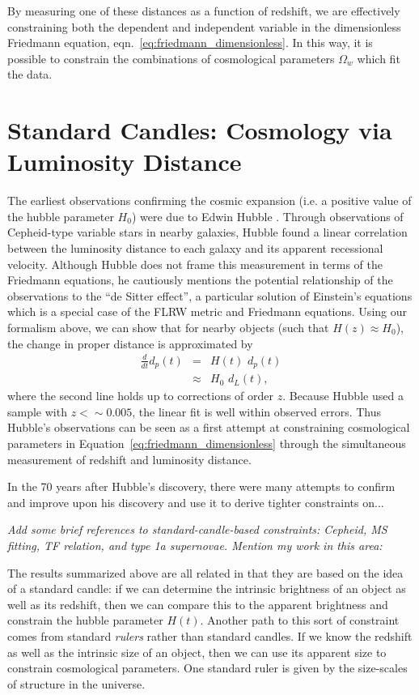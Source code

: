 By measuring one of these distances as a function of redshift, we are
effectively constraining both the dependent and independent variable
in the dimensionless Friedmann equation, eqn.~\ref{eq:friedmann_dimensionless}.
In this way, it is possible to constrain the combinations of cosmological
parameters $\Omega_w$ which fit the data.

\section{Standard Candles: Cosmology via Luminosity Distance}
The earliest observations confirming the cosmic expansion (i.e. a positive
value of the hubble parameter $H_0$) were due to Edwin Hubble
\citep{hubble1929}.  Through observations of Cepheid-type variable stars
in nearby galaxies, Hubble found a linear correlation between the
luminosity distance to each galaxy and its apparent recessional velocity.
Although Hubble does not frame this measurement in terms of the Friedmann
equations, he cautiously mentions the potential relationship of the
observations to the ``de Sitter effect'', a particular solution of
Einstein's equations which is a special case of the FLRW metric and
Friedmann equations. Using our formalism above, we can show that for
nearby objects (such that $H(z) \approx H_0$),
the change in proper distance is approximated by
\begin{eqnarray}
  \frac{d}{dt}d_p(t) &=& H(t)\,\, d_p(t) \nonumber\\
                     &\approx& H_0\,\, d_L(t),
\end{eqnarray}
where the second line holds up to corrections of order $z$.  Because
Hubble used a sample with $z <\sim 0.005$, the linear fit is well within
observed errors.
Thus Hubble's observations can be seen as a first attempt at constraining
cosmological parameters in Equation~\ref{eq:friedmann_dimensionless} through
the simultaneous measurement of redshift and luminosity distance.

In the 70 years after Hubble's discovery, there were many attempts to
confirm and improve upon his discovery and use it to derive tighter
constraints on...

{\it Add some brief references to standard-candle-based constraints:
  Cepheid, MS fitting, TF relation, and type 1a supernovae.  Mention my
  work in this area: \citet{Kessler2009}}

The results summarized above are all related in that they are based on the
idea of a standard candle: if we can determine the intrinsic brightness
of an object as well as its redshift, then we can compare this to the
apparent brightness and constrain the hubble parameter $H(t)$.
Another path to this sort of constraint comes from standard {\it rulers}
rather than standard candles.  If we know the redshift as well as the
intrinsic size of an object, then we can use its apparent size to
constrain cosmological parameters.  One standard ruler is given by the
size-scales of structure in the universe.

